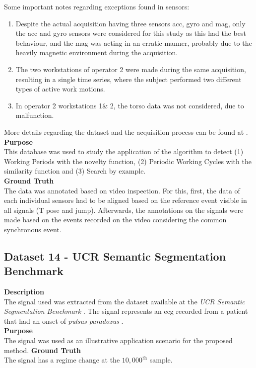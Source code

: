 Some important notes regarding exceptions found in sensors:
\begin{enumerate}
\item Despite the actual acquisition having three sensors \gls{acc}, \gls{gyro} and \gls{mag}, only the \gls{acc} and \gls{gyro} sensors were considered for this study as this had the best behaviour, and the \gls{mag} was acting in an erratic manner, probably due to the heavily magnetic environment during the acquisition.
\item The two workstations of operator 2 were made during the same acquisition, resulting in a single time series, where the subject performed two different types of active work motions.
\item In operator 2 workstations 1\& 2, the torso data was not considered, due to malfunction.
\end{enumerate}

More details regarding the dataset and the acquisition process can be found at \cite{santos2019, sara}.\\
\textbf{Purpose}\hfill \\
This database was used to study the application of the algorithm to detect (1) Working Periods with the novelty function, (2) Periodic Working Cycles with the similarity function and (3) Search by example. \\
\textbf{Ground Truth}\hfill \\
The data was annotated based on video inspection. For this, first, the data of each individual sensors had to be aligned based on the reference event visible in all signals (T pose and jump). Afterwards, the annotations on the signals were made based on the events recorded on the video considering the common synchronous event.

\subsection{Dataset 14 - UCR Semantic Segmentation Benchmark}
\label{dat:dataset15}

\textbf{Description}\\
The signal used was extracted from the dataset available at the \textit{UCR Semantic Segmentation Benchmark} \cite{eamonn_segmentation}. The signal represents an \gls{ecg} recorded from a patient that had an onset of \textit{pulsus paradoxus} \cite{pulsusparadoxus, pulsusparadoxus2}.\\
\textbf{Purpose}\\
The signal was used as an illustrative application scenario for the proposed method.
\textbf{Ground Truth}\\
The signal has a regime change at the $10,000^\text{th}$ sample.\\

